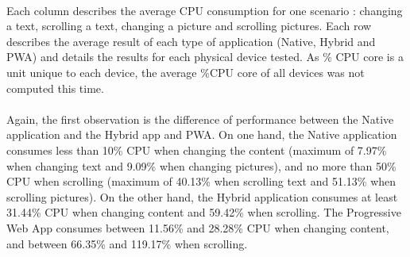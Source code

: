 \documentclass{kththesis}
\begin{document}
\begin{table}[h]
    \centering
    
    \caption{Average CPU usage (\% CPU core)}
    \label{tab:cpu}
\end{table}

\paragraph{}
Each column describes the average CPU consumption for one scenario : changing a text, scrolling a text, changing a picture and scrolling pictures. Each row describes the average result of each type of application (Native, Hybrid and PWA) and details the results for each physical device tested. As \% CPU core is a unit unique to each device, the average \%CPU core of all devices was not computed this time. 

\paragraph{}
Again, the first observation is the difference of performance between the Native application and the Hybrid app and PWA. On one hand, the Native application consumes less than 10\% CPU when changing the content (maximum of 7.97\% when changing text and 9.09\% when changing pictures), and no more than 50\% CPU when scrolling (maximum of 40.13\% when scrolling text and 51.13\% when scrolling pictures). On the other hand, the Hybrid application consumes at least 31.44\% CPU when changing content and 59.42\% when scrolling. The Progressive Web App consumes between 11.56\% and 28.28\% CPU when changing content, and between 66.35\% and 119.17\% when scrolling.
\end{document}
